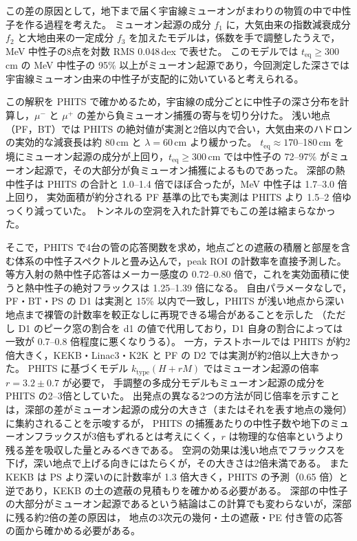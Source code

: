 \documentclass[a4paper,11pt]{ltjsarticle}
\newcommand{\teq}{t_{\mathrm{eq}}}
\begin{document}
この差の原因として，地下まで届く宇宙線ミューオンがまわりの物質の中で中性子を作る過程を考えた。
ミューオン起源の成分 $f_1$ に，大気由来の指数減衰成分 $f_2$ と大地由来の一定成分 $f_3$ を加えたモデルは，係数を手で調整したうえで，MeV 中性子の8点を対数 RMS 0.048\,dex で表せた。
このモデルでは $\teq\ge300$\,cm の MeV 中性子の 95\% 以上がミューオン起源であり，今回測定した深さでは宇宙線ミューオン由来の中性子が支配的に効いていると考えられる。

この解釈を PHITS で確かめるため，宇宙線の成分ごとに中性子の深さ分布を計算し，$\mu^-$ と $\mu^+$ の差から負ミューオン捕獲の寄与を切り分けた。
浅い地点（PF，BT）では PHITS の絶対値が実測と2倍以内で合い，大気由来のハドロンの実効的な減衰長は約 80\,cm と $\lambda=60$\,cm より緩かった。
$\teq\approx170$--180\,cm を境にミューオン起源の成分が上回り，$\teq\ge300$\,cm では中性子の 72--97\% がミューオン起源で，その大部分が負ミューオン捕獲によるものであった。
深部の熱中性子は PHITS の合計と 1.0--1.4 倍でほぼ合ったが，MeV 中性子は 1.7--3.0 倍上回り，
実効面積が約分される PF 基準の比でも実測は PHITS より 1.5--2 倍ゆっくり減っていた。
トンネルの空洞を入れた計算でもこの差は縮まらなかった。

そこで，PHITS で4台の管の応答関数を求め，地点ごとの遮蔽の積層と部屋を含む体系の中性子スペクトルと畳み込んで，peak ROI の計数率を直接予測した。
等方入射の熱中性子応答はメーカー感度の 0.72--0.80 倍で，これを実効面積に使うと熱中性子の絶対フラックスは 1.25--1.39 倍になる。
自由パラメータなしで，PF・BT・PS の D1 は実測と 15\% 以内で一致し，PHITS が浅い地点から深い地点まで裸管の計数率を較正なしに再現できる場合があることを示した
（ただし D1 のピーク窓の割合を d1 の値で代用しており，D1 自身の割合によっては一致が 0.7--0.8 倍程度に悪くなりうる）。
一方，テストホールでは PHITS が約2倍大きく，KEKB・Linac3・K2K と PF の D2 では実測が約2倍以上大きかった。
PHITS に基づくモデル $k_{\mathrm{type}}(H+rM)$ ではミューオン起源の倍率 $r=3.2\pm0.7$ が必要で，
手調整の多成分モデルもミューオン起源の成分を PHITS の2--3倍としていた。
出発点の異なる2つの方法が同じ倍率を示すことは，深部の差がミューオン起源の成分の大きさ（またはそれを表す地点の幾何）に集約されることを示唆するが，
PHITS の捕獲あたりの中性子数や地下のミューオンフラックスが3倍もずれるとは考えにくく，$r$ は物理的な倍率というより残る差を吸収した量とみるべきである。
空洞の効果は浅い地点でフラックスを下げ，深い地点で上げる向きにはたらくが，その大きさは2倍未満である。
また KEKB は PS より深いのに計数率が 1.3 倍大きく，PHITS の予測（0.65 倍）と逆であり，KEKB の土の遮蔽の見積もりを確かめる必要がある。
深部の中性子の大部分がミューオン起源であるという結論はこの計算でも変わらないが，深部に残る約2倍の差の原因は，
地点の3次元の幾何・土の遮蔽・PE 付き管の応答の面から確かめる必要がある。
\end{document}
